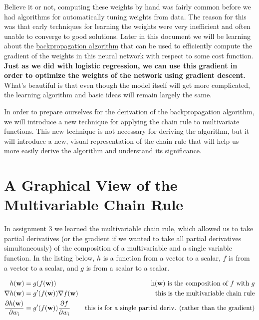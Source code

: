 \documentclass[assignment06_Solutions]{subfiles}
\begin{document}
Believe it or not, computing these weights by hand was fairly common before we had algorithms for automatically tuning weights from data.  The reason for this was that early techniques for learning the weights were very inefficient and often unable to converge to good solutions.  Later in this document we will be learning about the \href{https://en.wikipedia.org/wiki/Backpropagation}{backpropagation algorithm} that can be used to efficiently compute the gradient of the weights in this neural network with respect to some cost function.  \textbf{Just as we did with logistic regression, we can use this gradient in order to optimize the weights of the network using gradient descent.}  What's beautiful is that even though the model itself will get more complicated, the learning algorithm and basic ideas will remain largely the same.

In order to prepare ourselves for the derivation of the backpropagation algorithm, we will introduce a new technique for applying the chain rule to multivariate functions.  This new technique is not necessary for deriving the algorithm, but it will introduce a new, visual representation of the chain rule that will help us more easily derive the algorithm and understand its significance.


\section{A Graphical View of the Multivariable Chain Rule}

In assignment 3 we learned the multivariable chain rule, which allowed us to take partial derivatives (or the gradient if we wanted to take all partial derivatives simultaneously) of the composition of a multivariable and a single variable function.  In the listing below, $h$ is a function from a vector to a scalar, $f$ is from a vector to a scalar, and $g$ is from a scalar to a scalar.

\begin{align}
h(\mathbf{w}) &= g(f(\mathbf{w}))&\mbox{h($\mathbf{w}$) is the composition of $f$ with $g$} \nonumber \\
\nabla h(\mathbf{w}) &= g'(f(\mathbf{w})) \nabla f(\mathbf{w}) & \mbox{this is the multivariable chain rule} \\
\frac{\partial h(\mathbf{w})}{\partial w_i} &= g'(f(\mathbf{w})) \frac{\partial f}{\partial w_i}& \mbox{this is for a single partial deriv. (rather than the gradient)}
\end{align}
\end{document}
